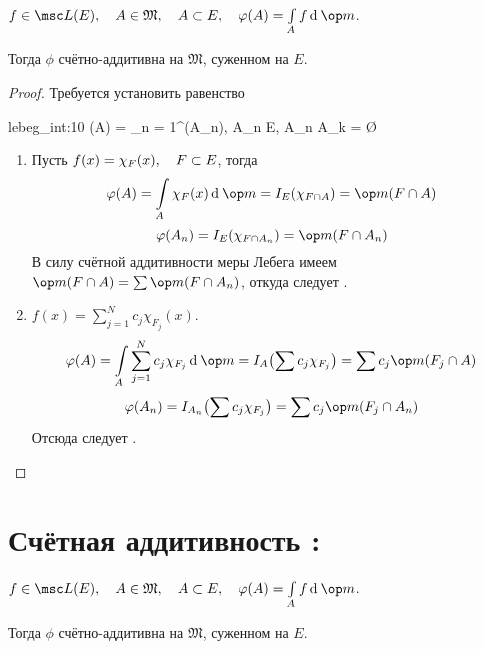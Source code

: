 \begin{theorem}
	$ f \in \msc L(E), \quad A \in \mathfrak M, \quad A \sub E, \quad \phi(A) = \int\limits_A f \di \op m $.

	Тогда $ \phi $ счётно-аддитивна на $ \mathfrak M $, суженном на $ E $.
\end{theorem}

\begin{proof}
	Требуется установить равенство
	\begin{equ}{lebeg_int:10}
		\phi(A) = \sum_{n = 1}^\infty \phi(A_n), \quad {} A_n \sub E, \quad A_n \cap A_k = \O
	\end{equ}

	\begin{enumerate}
		\item Пусть $ f(x) = \chi_F(x), \quad F \subset E $, тогда
			$$ \phi(A) = \int\limits_A \chi_F(x) \di \op m = I_E(\chi_{F \cap A}) = \op m (F \cap A) $$
			$$ \phi(A_n) = I_E(\chi_{F \cap A_n}) = \op m (F \cap A_n) $$
			В силу счётной аддитивности меры Лебега имеем $ \op m(F \cap A) = \sum \op m(F \cap A_n) $, откуда следует .

		\item \label{en:lebeg_int:2} $ f(x) = \sum_{j = 1}^N c_j \chi_{F_j}(x) $.
			$$ \phi(A) = \int\limits_A \sum_{j = 1}^N c_j \chi_{F_j} \di \op m = I_A \bigl( \sum c_j \chi_{F_j} \bigr) = \sum c_j \op m(F_j \cap A) $$
			$$ \phi(A_n) = I_{A_n} \bigl( \sum c_j \chi_{F_j} \bigr) = \sum c_j \op m (F_j \cap A_n) $$
			Отсюда следует .
	\end{enumerate}
\end{proof}

\section{Счётная аддитивность : }

\begin{theorem}
	$ f \in \msc L(E), \quad A \in \mathfrak M, \quad A \sub E, \quad \phi(A) = \int\limits_A f \di \op m $.

	Тогда $ \phi $ счётно-аддитивна на $ \mathfrak M $, суженном на $ E $.
\end{theorem}

